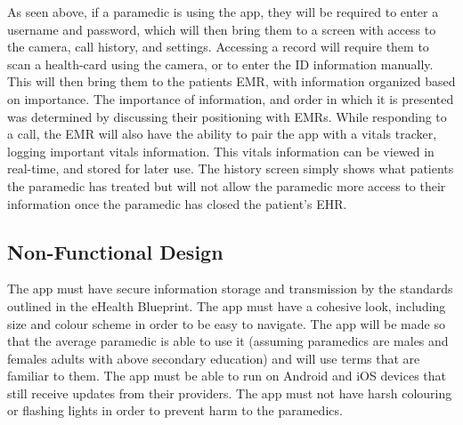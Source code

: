 As seen above, if a paramedic is using the app, they will be required to enter a username and password, which will then bring them to a screen with access to the camera, call history, and settings. Accessing a record will require them to scan a health-card using the camera, or to enter the ID information manually. This will then bring them to the patients EMR, with information organized based on importance. The importance of information, and order in which it is presented was determined by discussing their positioning with EMRs. While responding to a call, the EMR will also have the ability to pair the app with a vitals tracker, logging important vitals information. This vitals information can be viewed in real-time, and stored for later use. The history screen simply shows what patients the paramedic has treated but will not allow the paramedic more access to their information once the paramedic has closed the patient's EHR.

\subsection{Non-Functional Design}
The app must have secure information storage and transmission by the standards outlined in the eHealth Blueprint. The app must have a cohesive look, including size and colour scheme in order to be easy to navigate. The app will be made so that the average paramedic is able to use it (assuming paramedics are males and females adults with above secondary education) and will use terms that are familiar to them.
The app must be able to run on Android and iOS devices that still receive updates from their providers. The app must not have harsh colouring or flashing lights in order to prevent harm to the paramedics.

